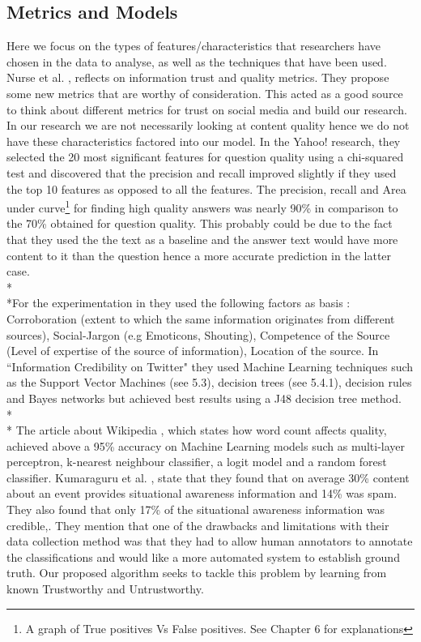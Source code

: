 \subsection{Metrics and Models}
Here we focus on the types of features/characteristics that researchers have chosen in the data to analyse, as well as the techniques that have been used.
Nurse et al. \cite{7}, reflects on information trust and quality metrics. They propose some new metrics that are worthy of consideration. This acted as a good source to think about different metrics for trust on social media and build our research.
In our research we are not necessarily looking at content quality hence we do not have these characteristics factored into our model. In the Yahoo! research\cite{5}, they selected the 20 most significant features for question quality using a chi-squared test and discovered that the precision and recall improved slightly if they used the top 10 features as opposed to all the features. The precision, recall and Area under curve\footnote{A graph of True positives Vs False positives. See Chapter 6 for explanations} for finding high quality answers was nearly 90\% in comparison to the 70\% obtained for question quality. This probably could be due to the fact that they used the the text as a baseline and the answer text would have more content to it than the question hence a more accurate prediction in the latter case. \\*\\*For the experimentation in \cite{7} they used the following factors as basis : Corroboration (extent to which the same information originates from different sources), Social-Jargon (e.g Emoticons, Shouting), Competence of the Source (Level of expertise of the source of information), Location of the source. In ``Information Credibility on Twitter"\cite{12} they used Machine Learning techniques such as the Support Vector Machines (see 5.3), decision trees (see 5.4.1), decision rules and Bayes networks but achieved best results using a J48 decision tree method. \\*\\*
The article about Wikipedia \cite{4}, which states how word count affects quality, achieved above a 95\% accuracy on Machine Learning models such as multi-layer perceptron, k-nearest neighbour classifier, a logit model and a random forest classifier. Kumaraguru et al. \cite{11}, state that they found that on average 30\% content about an event provides situational awareness information and 14\% was spam. They also found that only 17\% of the situational awareness information was credible\cite{11},. They mention that one of the drawbacks and limitations with their data collection method was that they had to allow human annotators to annotate the classifications and would like a more automated system to establish ground truth. Our proposed algorithm seeks to tackle this problem by learning from known Trustworthy and Untrustworthy. 
